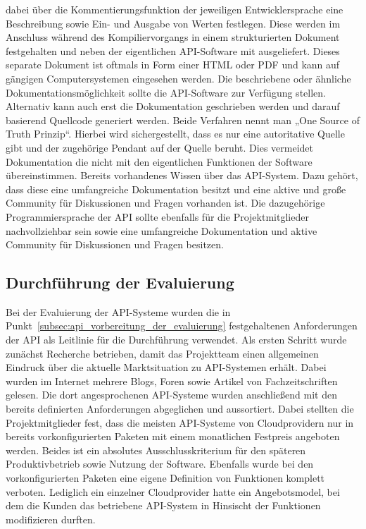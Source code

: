 \begin{outline}
  dabei über die Kommentierungsfunktion der jeweiligen Entwicklersprache eine
  Beschreibung sowie Ein- und Ausgabe von Werten festlegen. Diese werden im
  Anschluss während des Kompiliervorgangs in einem strukturierten Dokument
  festgehalten und neben der eigentlichen API-Software mit ausgeliefert. Dieses
  separate Dokument ist oftmals in Form einer HTML oder PDF und kann auf
  gängigen Computersystemen eingesehen werden. Die beschriebene oder ähnliche
  Dokumentationsmöglichkeit sollte die API-Software zur Verfügung stellen.
  Alternativ kann auch erst die Dokumentation geschrieben werden und darauf
  basierend Quellcode generiert werden. Beide Verfahren nennt man „One Source
  of Truth Prinzip“. Hierbei wird sichergestellt, dass es nur eine autoritative
  Quelle gibt und der zugehörige Pendant auf der Quelle beruht. Dies vermeidet
  Dokumentation die nicht mit den eigentlichen Funktionen der Software
  übereinstimmen.
  \1 Bereits vorhandenes Wissen über das API-System. Dazu gehört, dass diese
  eine umfangreiche Dokumentation besitzt und eine aktive und große Community
  für Diskussionen und Fragen vorhanden ist. Die dazugehörige
  Programmiersprache der API sollte ebenfalls für die Projektmitglieder
  nachvollziehbar sein sowie eine umfangreiche Dokumentation und aktive
  Community für Diskussionen und Fragen besitzen.
\end{outline}
\nl%

\subsection{Durchführung der Evaluierung}
\label{subsec:api_durchfuehrung_der_evaluierung}
Bei der Evaluierung der API-Systeme wurden die in
Punkt~\ref{subsec:api_vorbereitung_der_evaluierung} festgehaltenen
Anforderungen der API als Leitlinie für die Durchführung verwendet. Als ersten
Schritt wurde zunächst Recherche betrieben, damit das Projektteam einen
allgemeinen Eindruck über die aktuelle Marktsituation zu API-Systemen erhält.
Dabei wurden im Internet mehrere Blogs, Foren sowie Artikel von
Fachzeitschriften gelesen. Die dort angesprochenen API-Systeme wurden
anschließend mit den bereits definierten Anforderungen abgeglichen und
aussortiert. Dabei stellten die Projektmitglieder fest, dass die meisten
API-Systeme von Cloudprovidern nur in bereits vorkonfigurierten Paketen mit
einem monatlichen Festpreis angeboten werden. Beides ist ein absolutes
Ausschlusskriterium für den späteren Produktivbetrieb sowie Nutzung der
Software. Ebenfalls wurde bei den vorkonfigurierten Paketen eine eigene
Definition von Funktionen komplett verboten. Lediglich ein einzelner
Cloudprovider hatte ein Angebotsmodel, bei dem die Kunden das betriebene
API-System in Hinsischt der Funktionen modifizieren durften.

